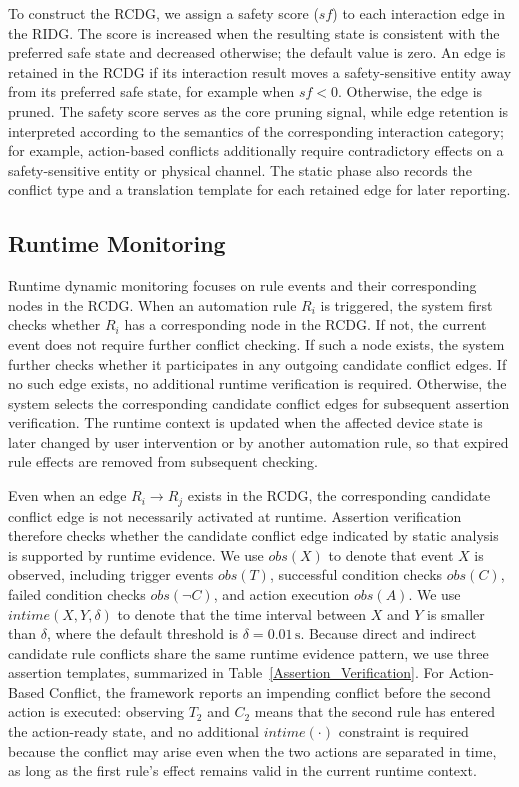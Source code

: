 To construct the RCDG, we assign a safety score ($sf$) to each interaction edge in the RIDG. The score is increased when the resulting state is consistent with the preferred safe state and decreased otherwise; the default value is zero. An edge is retained in the RCDG if its interaction result moves a safety-sensitive entity away from its preferred safe state, for example when $sf<0$. Otherwise, the edge is pruned. The safety score serves as the core pruning signal, while edge retention is interpreted according to the semantics of the corresponding interaction category; for example, action-based conflicts additionally require contradictory effects on a safety-sensitive entity or physical channel. The static phase also records the conflict type and a translation template for each retained edge for later reporting.

\subsection{Runtime Monitoring}

Runtime dynamic monitoring focuses on rule events and their corresponding nodes in the RCDG. When an automation rule $R_i$ is triggered, the system first checks whether $R_i$ has a corresponding node in the RCDG. If not, the current event does not require further conflict checking. If such a node exists, the system further checks whether it participates in any outgoing candidate conflict edges. If no such edge exists, no additional runtime verification is required. Otherwise, the system selects the corresponding candidate conflict edges for subsequent assertion verification. The runtime context is updated when the affected device state is later changed by user intervention or by another automation rule, so that expired rule effects are removed from subsequent checking.

Even when an edge $R_i \rightarrow R_j$ exists in the RCDG, the corresponding candidate conflict edge is not necessarily activated at runtime. Assertion verification therefore checks whether the candidate conflict edge indicated by static analysis is supported by runtime evidence. We use $obs(X)$ to denote that event $X$ is observed, including trigger events $obs(T)$, successful condition checks $obs(C)$, failed condition checks $obs(\neg C)$, and action execution $obs(A)$. We use $intime(X,Y,\delta)$ to denote that the time interval between $X$ and $Y$ is smaller than $\delta$, where the default threshold is $\delta = 0.01\,\mathrm{s}$. Because direct and indirect candidate rule conflicts share the same runtime evidence pattern, we use three assertion templates, summarized in Table~\ref{Assertion_Verification}. For Action-Based Conflict, the framework reports an impending conflict before the second action is executed: observing $T_2$ and $C_2$ means that the second rule has entered the action-ready state, and no additional $intime(\cdot)$ constraint is required because the conflict may arise even when the two actions are separated in time, as long as the first rule's effect remains valid in the current runtime context.

